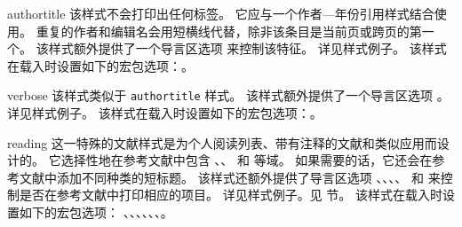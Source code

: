 \begin{marglist}
\item[authortitle]
该样式不会打印出任何标签。
它应与一个作者---年份引用样式结合使用。
重复的作者和编辑名会用短横线代替，除非该条目是当前页或跨页的第一个。
该样式额外提供了一个导言区选项  来控制该特征。
详见样式例子。
该样式在载入时设置如下的宏包选项：。

\item[verbose]
该样式类似于 \texttt{authortitle} 样式。
该样式额外提供了一个导言区选项 。
详见样式例子。
该样式在载入时设置如下的宏包选项：。

\item[reading]
这一特殊的文献样式是为个人阅读列表、带有注释的文献和类似应用而设计的。
它选择性地在参考文献中包含 、、 和  等域。
如果需要的话，它还会在参考文献中添加不同种类的短标题。
该样式还额外提供了导言区选项 、、、、 和  来控制是否在参考文献中打印相应的项目。
详见样式例子。见  节。
该样式在载入时设置如下的宏包选项：
、、、、、、。

\end{marglist}

